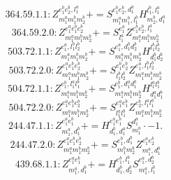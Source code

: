 \documentclass[letterpaper,10pt,fleqn,leqno,onecolumn]{article}
\begin{document}
\begin{equation} \;\;\;\;\;\;  364.59.1.1: Z^{e_{1}^{b}e_{2}^{b},l_{1}^{a}}_{m_{1}^{a}m_{1}^{b}m_{2}^{b}}+=S^{e_{1}^{b}e_{2}^{b},d_{1}^{a}}_{m_{1}^{a}m_{1}^{b},l_{1}^{b}}H^{l_{1}^{b},l_{1}^{a}}_{m_{2}^{b},d_{1}^{a}} \end{equation}
\begin{equation} \;\;\;\;\;\;  364.59.2.0: Z^{e_{1}^{a}e_{1}^{b}e_{2}^{b}}_{m_{1}^{a}m_{1}^{b}m_{2}^{b}}+=S^{e_{1}^{a}}_{l_{1}^{a}}Z^{e_{1}^{b}e_{2}^{b},l_{1}^{a}}_{m_{1}^{a}m_{1}^{b}m_{2}^{b}} \end{equation}
\begin{equation} \;\;\;\;\;\;  503.72.1.1: Z^{e_{1}^{a},l_{1}^{b}l_{2}^{b}}_{m_{1}^{a}m_{1}^{b}m_{2}^{b}}+=S^{e_{1}^{a},d_{1}^{b}d_{2}^{b}}_{m_{1}^{a}m_{1}^{b}m_{2}^{b}}H^{l_{1}^{b}l_{2}^{b}}_{d_{1}^{b}d_{2}^{b}} \end{equation}
\begin{equation} \;\;\;\;\;\;  503.72.2.0: Z^{e_{1}^{a}e_{1}^{b}e_{2}^{b}}_{m_{1}^{a}m_{1}^{b}m_{2}^{b}}+=S^{e_{1}^{b}e_{2}^{b}}_{l_{1}^{b}l_{2}^{b}}Z^{e_{1}^{a},l_{1}^{b}l_{2}^{b}}_{m_{1}^{a}m_{1}^{b}m_{2}^{b}} \end{equation}
\begin{equation} \;\;\;\;\;\;  504.72.1.1: Z^{e_{1}^{b},l_{1}^{a}l_{1}^{b}}_{m_{1}^{a}m_{1}^{b}m_{2}^{b}}+=S^{e_{1}^{b},d_{1}^{a}d_{1}^{b}}_{m_{1}^{a}m_{1}^{b}m_{2}^{b}}H^{l_{1}^{a}l_{1}^{b}}_{d_{1}^{a}d_{1}^{b}} \end{equation}
\begin{equation} \;\;\;\;\;\;  504.72.2.0: Z^{e_{1}^{a}e_{1}^{b}e_{2}^{b}}_{m_{1}^{a}m_{1}^{b}m_{2}^{b}}+=S^{e_{1}^{a}e_{1}^{b}}_{l_{1}^{a}l_{1}^{b}}Z^{e_{2}^{b},l_{1}^{a}l_{1}^{b}}_{m_{1}^{a}m_{1}^{b}m_{2}^{b}} \end{equation}
\begin{equation} \;\;\;\;\;\;  244.47.1.1: Z^{e_{1}^{a}e_{1}^{b}}_{m_{1}^{a},d_{1}^{b}}+=H^{e_{1}^{a}e_{1}^{b}}_{d_{1}^{b},d_{1}^{a}}S^{d_{1}^{a}}_{m_{1}^{a}}\cdot -1. \end{equation}
\begin{equation} \;\;\;\;\;\;  244.47.2.0: Z^{e_{1}^{a}e_{1}^{b}e_{2}^{b}}_{m_{1}^{a}m_{1}^{b}m_{2}^{b}}+=S^{e_{1}^{b},d_{1}^{b}}_{m_{1}^{b}m_{2}^{b}}Z^{e_{1}^{a}e_{2}^{b}}_{m_{1}^{a},d_{1}^{b}} \end{equation}
\begin{equation} \;\;\;\;\;\;  439.68.1.1: Z^{e_{1}^{a}e_{1}^{b}}_{m_{1}^{a},d_{1}^{b}}+=H^{e_{1}^{b},l_{1}^{b}}_{d_{1}^{b},d_{2}^{b}}S^{e_{1}^{a},d_{2}^{b}}_{m_{1}^{a},l_{1}^{b}} \end{equation}
\end{document}
